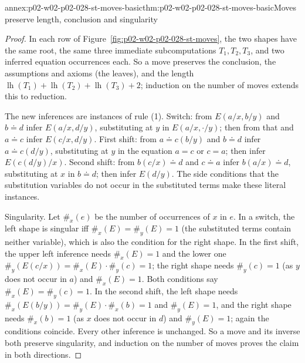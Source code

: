 \begin{annexitem}{annex:p02-w02-p02-028-st-moves-basic}{thm:p02-w02-p02-028-st-moves-basic}{Moves preserve length, conclusion and singularity}
\begin{proof}
In each row of Figure~\ref{fig:p02-w02-p02-028-st-moves}, the two shapes have
the same root, the same three immediate subcomputations \(T_1,T_2,T_3\), and
two inferred equation occurrences each.  So a move preserves the conclusion,
the assumptions and axioms (the leaves), and the length
\(\operatorname{lh}(T_1)+\operatorname{lh}(T_2)+\operatorname{lh}(T_3)+2\);
induction on the number of moves extends this to reduction.

The new inferences are instances of rule (1).  Switch: from
\(E(a/x,b/y)\) and \(b\doteq d\) infer \(E(a/x,d/y)\), substituting at \(y\)
in \(E(a/x,\cdot/y)\); then from that and \(a\doteq c\) infer
\(E(c/x,d/y)\).  First shift: from \(a\doteq c(b/y)\) and \(b\doteq d\)
infer \(a\doteq c(d/y)\), substituting at \(y\) in the equation \(a=c\) or
\(c=a\); then infer \(E(c(d/y)/x)\).  Second shift: from \(b(c/x)\doteq d\)
and \(c\doteq a\) infer \(b(a/x)\doteq d\), substituting at \(x\) in
\(b\doteq d\); then infer \(E(d/y)\).  The side conditions that the
substitution variables do not occur in the substituted terms make these
literal instances.

Singularity.  Let \(\#_x(e)\) be the number of occurrences of \(x\) in
\(e\).  In a switch, the left shape is singular iff
\(\#_x(E)=\#_y(E)=1\) (the substituted terms contain neither variable), which
is also the condition for the right shape.  In the first shift, the upper
left inference needs \(\#_x(E)=1\) and the lower one
\(\#_y(E(c/x))=\#_x(E)\cdot\#_y(c)=1\); the right shape needs
\(\#_y(c)=1\) (as \(y\) does not occur in \(a\)) and \(\#_x(E)=1\).  Both
conditions say \(\#_x(E)=\#_y(c)=1\).  In the second shift, the left shape
needs \(\#_x(E(b/y))=\#_y(E)\cdot\#_x(b)=1\) and \(\#_y(E)=1\), and the right
shape needs \(\#_x(b)=1\) (as \(x\) does not occur in \(d\)) and
\(\#_y(E)=1\); again the conditions coincide.  Every other inference is
unchanged.  So a move and its inverse both preserve singularity, and
induction on the number of moves proves the claim in both directions.
\end{proof}
\end{annexitem}

